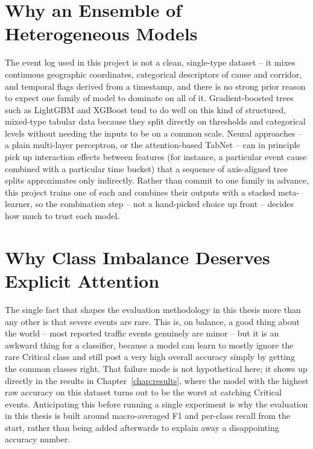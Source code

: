 \section{Why an Ensemble of Heterogeneous Models}

The event log used in this project is not a clean, single-type dataset -- it mixes continuous geographic coordinates, categorical descriptors of cause and corridor, and temporal flags derived from a timestamp, and there is no strong prior reason to expect one family of model to dominate on all of it. Gradient-boosted trees such as LightGBM and XGBoost tend to do well on this kind of structured, mixed-type tabular data because they split directly on thresholds and categorical levels without needing the inputs to be on a common scale. Neural approaches -- a plain multi-layer perceptron, or the attention-based TabNet -- can in principle pick up interaction effects between features (for instance, a particular event cause combined with a particular time bucket) that a sequence of axis-aligned tree splits approximates only indirectly. Rather than commit to one family in advance, this project trains one of each and combines their outputs with a stacked meta-learner, so the combination step -- not a hand-picked choice up front -- decides how much to trust each model.

\section{Why Class Imbalance Deserves Explicit Attention}

The single fact that shapes the evaluation methodology in this thesis more than any other is that severe events are rare. This is, on balance, a good thing about the world -- most reported traffic events genuinely are minor -- but it is an awkward thing for a classifier, because a model can learn to mostly ignore the rare Critical class and still post a very high overall accuracy simply by getting the common classes right. That failure mode is not hypothetical here; it shows up directly in the results in Chapter~\ref{chap:results}, where the model with the highest raw accuracy on this dataset turns out to be the worst at catching Critical events. Anticipating this before running a single experiment is why the evaluation in this thesis is built around macro-averaged F1 and per-class recall from the start, rather than being added afterwards to explain away a disappointing accuracy number.
